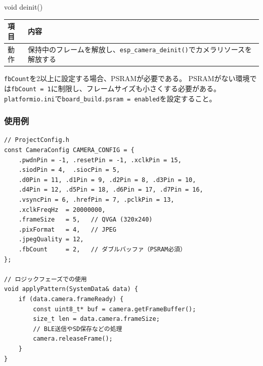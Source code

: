 \begin{funcblock}{void deinit()}
\begin{tabularx}{\textwidth}{l X}
\toprule
\textbf{項目} & \textbf{内容} \\
\midrule
動作   & 保持中のフレームを解放し、\texttt{esp\_camera\_deinit()}でカメラリソースを解放する \\
\bottomrule
\end{tabularx}
\end{funcblock}

\begin{cautionbox}[PSRAMの必要性]
\texttt{fbCount}を2以上に設定する場合、PSRAMが必要である。
PSRAMがない環境では\texttt{fbCount = 1}に制限し、フレームサイズも小さくする必要がある。
\texttt{platformio.ini}で\texttt{board\_build.psram = enabled}を設定すること。
\end{cautionbox}

\subsubsection{使用例}

\begin{lstlisting}[style=cppstyle, caption={CameraModuleの使用例}]
// ProjectConfig.h
const CameraConfig CAMERA_CONFIG = {
    .pwdnPin = -1, .resetPin = -1, .xclkPin = 15,
    .siodPin = 4,  .siocPin = 5,
    .d0Pin = 11, .d1Pin = 9, .d2Pin = 8, .d3Pin = 10,
    .d4Pin = 12, .d5Pin = 18, .d6Pin = 17, .d7Pin = 16,
    .vsyncPin = 6, .hrefPin = 7, .pclkPin = 13,
    .xclkFreqHz  = 20000000,
    .frameSize   = 5,   // QVGA (320x240)
    .pixFormat   = 4,   // JPEG
    .jpegQuality = 12,
    .fbCount     = 2,   // ダブルバッファ（PSRAM必須）
};

// ロジックフェーズでの使用
void applyPattern(SystemData& data) {
    if (data.camera.frameReady) {
        const uint8_t* buf = camera.getFrameBuffer();
        size_t len = data.camera.frameSize;
        // BLE送信やSD保存などの処理
        camera.releaseFrame();
    }
}
\end{lstlisting}
